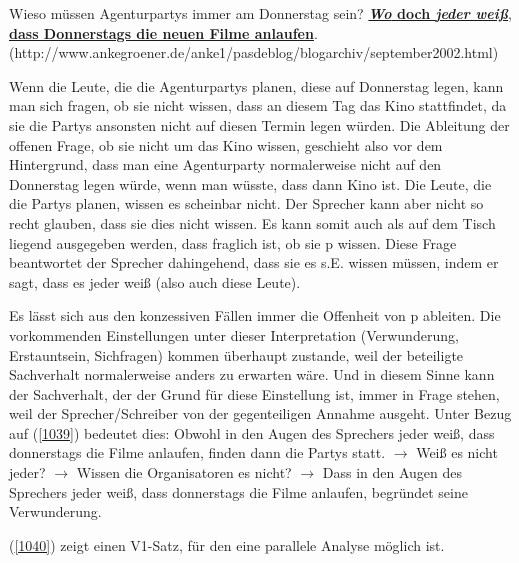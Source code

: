 {\begin{exe}
	\ex\label{1039} 
	\scriptsize
	Wieso müssen Agenturpartys immer am Donnerstag sein? \underline{\textbf{\textit{Wo} doch \textit{jeder weiß}}},\\ 
	\underline{\textbf{dass Donnerstags die neuen Filme anlaufen}}.                                      	
	\newline              		
	\hbox{}\hfill\hbox {(http://www.ankegroener.de/anke1/pasdeblog/blogarchiv/september2002.html)}
\end{exe}
Wenn die Leute, die die Agenturpartys planen, diese auf Donnerstag legen, kann man sich fragen, ob sie nicht wissen, dass an diesem Tag das Kino stattfindet, da sie die Partys ansonsten nicht auf diesen Termin legen würden. Die Ableitung der offenen Frage, ob sie nicht um das Kino wissen, geschieht also vor dem Hintergrund, dass man eine Agenturparty normalerweise nicht auf den Donnerstag legen würde, wenn man wüsste, dass dann Kino ist.  Die Leute, die die Partys planen, wissen es scheinbar nicht. Der Sprecher kann aber nicht so recht glauben, dass sie dies nicht wissen. Es kann somit auch als auf dem Tisch liegend ausgegeben werden, dass fraglich ist, ob sie p wissen. Diese Frage beantwortet der Sprecher dahingehend, dass sie es s.E. wissen müssen, indem er sagt, dass es jeder weiß (also auch diese Leute).

Es lässt sich aus den konzessiven Fällen immer die Offenheit von p ableiten. Die vorkommenden Einstellungen unter dieser Interpretation (Verwunderung, Erstauntsein, Sichfragen) kommen überhaupt zustande, weil der beteiligte Sachverhalt normalerweise anders zu erwarten wäre. Und in diesem Sinne kann der Sachverhalt, der der Grund für diese Einstellung ist, immer in Frage stehen, weil der Sprecher/Schreiber von der gegenteiligen Annahme ausgeht. Unter Bezug auf (\ref{1039}) bedeutet dies: Obwohl in den Augen des Sprechers jeder weiß, dass donnerstags die Filme anlaufen, finden dann die Partys statt. $\rightarrow$ Weiß es nicht jeder? $\rightarrow$ Wissen die Organisatoren es nicht? $\rightarrow$ Dass in den Augen des Sprechers jeder weiß, dass donnerstags die Filme anlaufen, begründet seine Verwunderung.

(\ref{1040}) zeigt einen V1-Satz, für den eine parallele Analyse möglich ist.

}
